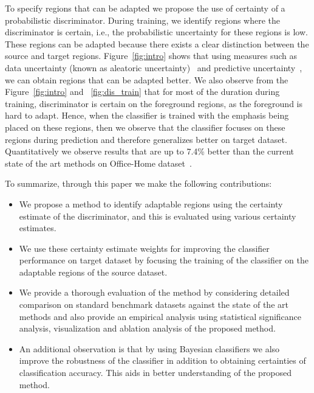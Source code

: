\documentclass[10pt,twocolumn,letterpaper]{article}
\begin{document}
 To specify regions that can be adapted we propose the use of certainty of a probabilistic discriminator. During training, we identify regions where the discriminator is certain, i.e., the probabilistic uncertainty for these regions is low. These regions can be adapted because there exists a clear distinction between the source and target regions. Figure~\ref{fig:intro} shows that using measures such as data uncertainty (known as aleatoric uncertainty)~\cite{kendall2017uncertainties} and predictive uncertainty~\cite{lakshminarayanan_nips2017}, we can obtain regions that can be adapted better. We also observe from the Figure~\ref{fig:intro} and ~\ref{fig:dis_train} that for most of the duration during training, discriminator is certain on the foreground regions, as the foreground is hard to adapt. Hence, when the classifier is trained with the emphasis being placed on these regions, then we observe that the classifier focuses on these regions during prediction and therefore generalizes better on target dataset. Quantitatively we observe results that are up to 7.4\% better than the current state of the art methods on Office-Home dataset~\cite{venkateswara_cvpr2017deep}. 

To summarize, through this paper we make the following contributions:
\begin{itemize}
    \vspace{-0.7em}
    \item We propose a method to identify adaptable regions using the certainty estimate of the discriminator, and this is evaluated using various certainty estimates.
    \vspace{-0.7em}
    \item We use these certainty estimate weights for improving the classifier performance on target dataset by focusing the training of the classifier on the adaptable regions of the source dataset.
    \vspace{-0.7em}
    \item We provide a thorough evaluation of the method by considering detailed comparison on standard benchmark datasets against the state of the art methods and also provide an empirical analysis using statistical significance analysis, visualization and ablation analysis of the proposed method.
    \vspace{-0.7em}
    \item An additional observation is that by using Bayesian classifiers we also improve the robustness of the classifier in addition to obtaining certainties of classification accuracy. This aids in better understanding of the proposed method.
\end{itemize}
\end{document}
